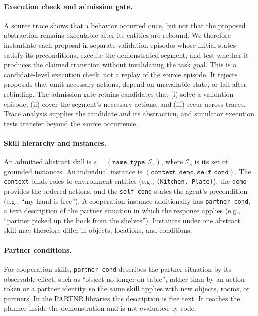\documentclass{article}
\theoremstyle{plain}
\theoremstyle{definition}
\theoremstyle{remark}
\begin{document}
\paragraph{Execution check and admission gate.}
A source trace shows that a behavior occurred once, but not that the proposed abstraction remains executable after its entities are rebound. We therefore instantiate each proposal in separate validation episodes whose initial states satisfy its preconditions, execute the demonstrated segment, and test whether it produces the claimed transition without invalidating the task goal. This is a candidate-level execution check, not a replay of the source episode. It rejects proposals that omit necessary actions, depend on unavailable state, or fail after rebinding. The admission gate retains candidates that (i) solve a validation episode, (ii) cover the segment's necessary actions, and (iii) recur across traces. Trace analysis supplies the candidate and its abstraction, and simulator execution tests transfer beyond the source occurrence.

\paragraph{Skill hierarchy and instances.}
An admitted abstract skill is $s=(\texttt{name},\texttt{type},\mathcal{I}_s)$, where $\mathcal{I}_s$ is its set of grounded instances. An individual instance is $(\texttt{context},\texttt{demo},\texttt{self\_cond})$. The \texttt{context} binds roles to environment entities (e.g., \texttt{(Kitchen, Plate)}), the \texttt{demo} provides the ordered actions, and the \texttt{self\_cond} states the agent's precondition (e.g., ``my hand is free''). A cooperation instance additionally has \texttt{partner\_cond}, a text description of the partner situation in which the response applies (e.g., ``partner picked up the book from the shelves''). Instances under one abstract skill may therefore differ in objects, locations, and conditions.

\paragraph{Partner conditions.}\label{subsec:effect_inference}
For cooperation skills, \texttt{partner\_cond} describes the partner situation by its observable effect, such as ``object no longer on table'', rather than by an action token or a partner identity, so the same skill applies with new objects, rooms, or partners. In the PARTNR libraries this description is free text. It reaches the planner inside the demonstration and is not evaluated by code.
 
\end{document}
